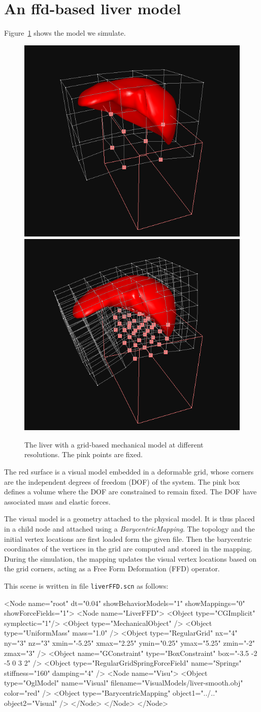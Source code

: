 \documentclass[a4paper,11pt]{article}
\newcommand{\file}[1]{\texttt{#1}}
\begin{document}
\section{An ffd-based liver model} \label{sec:ffd}
Figure~\ref{fig:ffd-lo} shows the model we simulate.
\begin{figure}[ht]
	\centering
	\includegraphics[height=0.3\linewidth]{ffd-lo}
	\includegraphics[height=0.3\linewidth]{ffd-hi} 
	\caption{The liver with a grid-based mechanical model at different resolutions. The pink points are fixed.}
	\label{fig:ffd-lo}
\end{figure}
The red surface is a visual model embedded in a deformable grid, whose corners are the independent degrees of freedom (DOF) of the system.
The pink box defines a volume where the DOF are constrained to remain fixed.
The DOF have associated mass and elastic forces.

The visual model is a geometry attached to the physical model. It is thus placed in a child node and attached using a \emph{BarycentricMapping}.
The topology and the initial vertex locations are first loaded form the given file. 
Then the barycentric coordinates of the vertices in the grid are computed and stored in the mapping.
During the simulation, the mapping updates the visual vertex locations based on the grid corners, acting as a Free Form Deformation (FFD) operator.


This scene is written in file \file{liverFFD.scn} as follows:
\begin{code_xml}
<Node name="root"  dt="0.04" showBehaviorModels="1" showMappings="0" showForceFields="1">
	<Node name="LiverFFD">
		<Object type="CGImplicit" symplectic="1"/>
		<Object type="MechanicalObject" />
		<Object type="UniformMass" mass="1.0" />
		<Object type="RegularGrid"
				nx="4" ny="3" nz="3"
				xmin="-5.25" xmax="2.25"
				ymin="0.25" ymax="5.25"
				zmin="-2" zmax="3"
			/>
		<Object name="GConstraint" type="BoxConstraint"
                        box="-3.5 -2 -5 0 3 2"
                        />
		<Object type="RegularGridSpringForceField" name="Springs" stiffness="160" damping="4" />
		<Node name="Visu">
			<Object type="OglModel" name="Visual" filename="VisualModels/liver-smooth.obj" color="red" />
			<Object type="BarycentricMapping" object1="../.." object2="Visual" />
		</Node>
	</Node>
</Node>
\end{code_xml}
\end{document}
